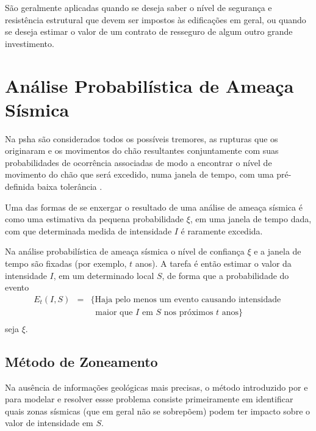 São geralmente aplicadas quando
se deseja saber o nível de segurança e resistência estrutural que devem ser impostos 
às edificações em geral, ou quando se deseja estimar o valor de um contrato de resseguro
de algum outro grande investimento.


\section{Análise Probabilística de Ameaça Sísmica }
\label{sec:psha}


Na \gls{psha} são considerados todos os possíveis tremores, as rupturas que os originaram e os movimentos do chão
resultantes conjuntamente com suas probabilidades de ocorrência associadas de modo a encontrar o nível de movimento do
chão que será excedido, numa janela de tempo, com uma pré-definida baixa tolerância \citep{baker_2008-1}.

Uma das formas de se enxergar o resultado de uma análise de ameaça sísmica
é como uma estimativa da pequena probabilidade $\xi$, em uma janela de tempo dada, 
com que determinada medida de intensidade $I$ é raramente excedida.

Na análise probabilística de ameaça sísmica o nível de confiança $\xi$ 
e a janela de tempo são fixadas (por exemplo, $t$ anos). A tarefa é então estimar
o valor da intensidade $I$, em um determinado local $S$, de forma que a probabilidade 
do evento
\begin{equation} \label{eventEt}
\begin{array}{lll}
 E_t(I, S)&=&\{\mbox{Haja pelo menos um evento causando intensidade }  \\
 &&  \;\;\mbox{maior que $I$ em }S  \mbox{ nos próximos }t \mbox{ anos}\} \\
\end{array}
\end{equation}
seja $\xi$.


\subsection{Método de Zoneamento}
\label{sec:zoneamento}

Na ausência de informações geológicas mais precisas, o método introduzido por \citet{cornell_1968} e
\citet{mcguire_1976} para modelar e resolver essse problema consiste 
primeiramente em identificar quais zonas sísmicas (que em geral não se sobrepõem) 
podem ter impacto sobre o valor de intensidade em $S$.

